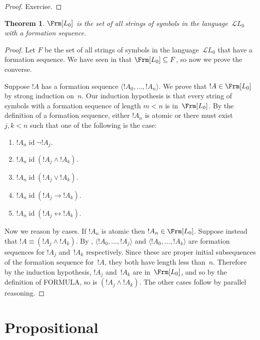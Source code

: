 \documentclass[10pt,a4paper]{article}
\makeatletter
\newcommand*{\olup}[1]{\MakeUppercase{#1}}
\theoremstyle{plain}
\newtheorem{thm}{Theorem}[section]
\theoremstyle{definition}
\theoremstyle{remark}
\newcommand*{\olfileid}[3]{}
\newcommand*{\olsection}[1]{\section*{#1}}
\newcommand*{\ollabel}[1]{\label{#1}}
\newcommand{\olref}{\@ifnextchar[{\olref@i}{\olref@final}}
\def\olref@i[#1]{\@ifnextchar[{\olref@ii}{\olref@final}}
\def\olref@ii[#1]{\@ifnextchar[{\olref@iii}{\olref@final}}
\def\olref@iii[#1]{\olref@final}
\def\olref@final#1{\ref{#1}}
\providecommand{\lif}{\mathbin{\rightarrow}}
\providecommand{\Lang}{\ensuremath{\mathcal{L}}}
\providecommand{\tuple}[1]{\langle #1 \rangle}
\providecommand{\tagitem}[1]{\item[#1]}
\providecommand{\liff}{\mathbin{\leftrightarrow}}
\providecommand{\ident}{\operatorname{id}}
\makeatother
\begin{document}
\begin{proof}
Exercise.
\end{proof}

\begin{thm}
\ollabel{thm:fseq-frm-equiv}
$\Frm[L_0]$ is the set of all strings of symbols
in the language~$\Lang L_0$ with a formation sequence.
\end{thm}

\begin{proof}
Let $F$ be the set of all strings of symbols in the
language~$\Lang L_0$ that have a formation sequence.
We have seen in \olref[pl][syn][fseq]{prop:formed} that
$\Frm[L_0] \subseteq F$, so now we prove the converse.

Suppose $!A$ has a formation sequence $\tuple{!A_0,\dotsc,!A_n}$.
We prove that $!A \in \Frm[L_0]$ by strong induction on~$n$.
Our induction hypothesis is that every string of symbols with a
formation sequence of length $m < n$ is in~$\Frm[L_0]$.
By the definition of a formation sequence, either $!A_n$ is
atomic or there must exist $j,k < n$ such that one of the
following is the case:
\begin{enumerate}
    \tagitem{prvNot}{$!A_n \ident \lnot !A_j$.}{}%
    \tagitem{prvAnd}{$!A_n \ident (!A_j \land !A_k)$.}{}%
    \tagitem{prvOr}{$!A_n \ident (!A_j \lor !A_k)$.}{}%
    \tagitem{prvIf}{$!A_n \ident (!A_j \lif !A_k)$.}{}%
    \tagitem{prvIff}{$!A_n \ident (!A_j \liff !A_k)$.}{}%
\end{enumerate}
Now we reason by cases. If $!A_n$ is atomic then
$!A_n \in \Frm[L_0]$. Suppose instead that $!A \equiv
(!A_j \land !A_k)$. By \olref[pl][syn][fseq]{lem:fseq-init},
$\tuple{!A_0,\dotsc,!A_j}$ and $\tuple{!A_0,\dotsc,!A_k}$ are
formation sequences for $!A_j$ and~$!A_k$ respectively. Since
these are proper initial subsequences of the formation sequence
for~$!A$, they both have length less than~$n$. Therefore by
the induction hypothesis, $!A_j$ and~$!A_k$ are in~$\Frm[L_0]$,
and so by the definition of \olup{formula}, so is
$(!A_j \land !A_k)$. The other cases follow by parallel
reasoning.
\end{proof}





\olfileid{pl}{syn}{fml}

\olsection{Propositional }
\end{document}
